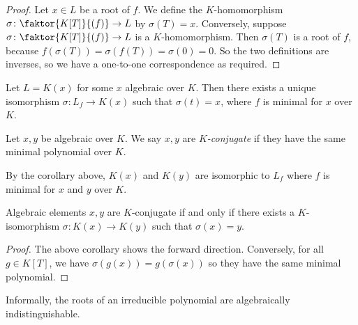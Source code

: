 \begin{proof}
	Let \( x \in L \) be a root of \( f \).
	We define the \( K \)-homomorphism \( \sigma \colon \faktor{K[T]}{(f)} \to L \) by \( \sigma(T) = x \).
	Conversely, suppose \( \sigma \colon \faktor{K[T]}{(f)} \to L \) is a \( K \)-homomorphism.
	Then \( \sigma(T) \) is a root of \( f \), because \( f(\sigma(T)) = \sigma(f(T)) = \sigma(0) = 0 \).
	So the two definitions are inverses, so we have a one-to-one correspondence as required.
\end{proof}
\begin{corollary}
	Let \( L = K(x) \) for some \( x \) algebraic over \( K \).
	Then there exists a unique isomorphism \( \sigma \colon L_f \to K(x) \) such that \( \sigma(t) = x \), where \( f \) is minimal for \( x \) over \( K \).
\end{corollary}
\begin{definition}
	Let \( x, y \) be algebraic over \( K \).
	We say \( x, y \) are \emph{\( K \)-conjugate} if they have the same minimal polynomial over \( K \).
\end{definition}
By the corollary above, \( K(x) \) and \( K(y) \) are isomorphic to \( L_f \) where \( f \) is minimal for \( x \) and \( y \) over \( K \).
\begin{corollary}
	Algebraic elements \( x, y \) are \( K \)-conjugate if and only if there exists a \( K \)-isomorphism \( \sigma \colon K(x) \to K(y) \) such that \( \sigma(x) = y \).
\end{corollary}
\begin{proof}
	The above corollary shows the forward direction.
	Conversely, for all \( g \in K[T] \), we have \( \sigma(g(x)) = g(\sigma(x)) \) so they have the same minimal polynomial.
\end{proof}
Informally, the roots of an irreducible polynomial are algebraically indistinguishable.

